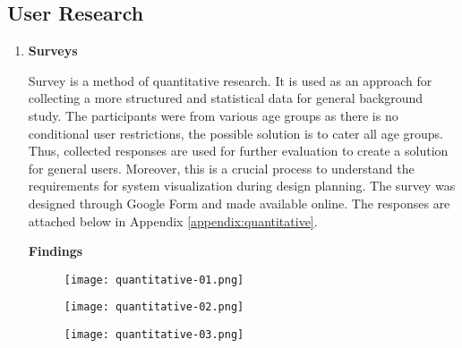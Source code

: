   \subsection{User Research}
  \begin{enumerate}[1.]
    \item \textbf{Surveys}
      \par Survey is a method of quantitative research. It is used as an approach for collecting a more structured and statistical data for general background study. The participants were from various age groups as there is no conditional user restrictions, the possible solution is to cater all age groups.  Thus, collected responses are used for further evaluation to create a solution for general users. Moreover, this is a crucial process to understand the requirements for system visualization during design planning. The survey was designed through Google Form and made available online. The responses are attached below in Appendix \ref{appendix:quantitative}.
      \par \textbf{Findings}
        \begin{figure}[H]
          \centering
          \texttt{[image: quantitative-01.png]}
          \caption{}
          \label{fig:quantitative-01}
        \end{figure}
        \begin{figure}[H]
          \centering
          \texttt{[image: quantitative-02.png]}
          \caption{}
          \label{fig:quantitative-02}
        \end{figure}
        \begin{figure}[H]
          \centering
          \texttt{[image: quantitative-03.png]}
          \caption{}
          \label{fig:quantitative-03}
        \end{figure}


\end{enumerate}
